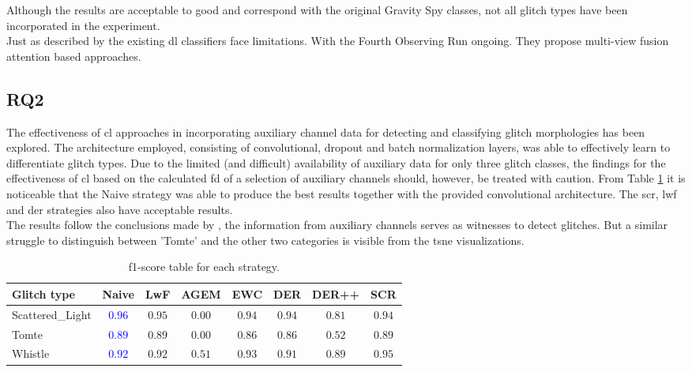 Although the results are acceptable to good and correspond with the original Gravity Spy classes, not all glitch types have been incorporated in the experiment. \\
Just as described by \citep{wu2024advancing} the existing \acrshort{dl} classifiers face limitations. With the Fourth Observing Run ongoing. They propose multi-view fusion attention based approaches. 

\subsection{RQ2}
The effectiveness of \acrshort{cl} approaches in incorporating auxiliary channel data for detecting and classifying glitch morphologies has been explored. The architecture employed, consisting of convolutional, dropout and batch normalization layers, was able to effectively learn to differentiate glitch types. 
Due to the limited (and difficult) availability of auxiliary data for only three glitch classes, the findings for the effectiveness of \acrshort{cl} based on the calculated \acrshort{fd} of a selection of auxiliary channels should, however, be treated with caution. 
From Table \ref{tbl:RQ2_discus_overview_f1_score} it is noticeable that the Naive strategy was able to produce the best results together with the provided convolutional architecture. The \acrshort{scr}, \acrshort{lwf} and \acrshort{der} strategies also have acceptable results. \\
The results follow the conclusions made by \citep{laguarta2024detection}, the information from auxiliary channels serves as witnesses to detect glitches. But a similar struggle to distinguish between 'Tomte' and the other two categories is visible from the \acrshort{tsne} visualizations. 

\begin{table}[ht]
\centering
    \begin{tabular}{|l|c c c c c c c|}
    \hline
    \textbf{Glitch type} & \textbf{Naive} & \textbf{LwF} & \textbf{AGEM} & \textbf{EWC} & \textbf{DER} & \textbf{DER++} & \textbf{SCR}\\ \hline
    Scattered\_Light & \textcolor{blue}{$0.96$} & $0.95$ &$0.00$ & $0.94$ & $0.94$ & $0.81$ & $0.94$\\
    Tomte & \textcolor{blue}{$0.89$} & $0.89$ &$0.00$ & $0.86$ & $0.86$ & $0.52$ & $0.89$\\
    Whistle & \textcolor{blue}{$0.92$} & $0.92$ & $0.51$ & $0.93$ & $0.91$ & $0.89$ & $0.95$\\
    \hline
    \end{tabular}
    \caption{f1-score table for each strategy.}
    \label{tbl:RQ2_discus_overview_f1_score}
\end{table}

